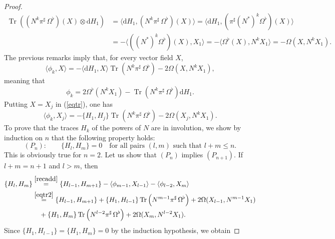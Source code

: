 \documentclass[10pt,a4paper]{amsart}
\def\Tr{\operatorname{Tr}}
\newcommand{\brke}[2]{{{\langle #1,#2\rangle}}}
\def\d{{\mathrm d}}
\def\parpo#1#2{\{#1,#2\}}
\begin{document}
\begin{proof}
\begin{equation}
\begin{split}
\Tr\left(({N}^k\pi^\sharp\,
\Omega^\flat)(X)\otimes \d H_1\right)
&=\brke{\d H_1}{({N}^k\pi^\sharp\,
\Omega^\flat)(X)}
=\brke{\d H_1}{(\pi^\sharp ({N}^*)^k \Omega^\flat)(X)}\\
&=-\brke{(({N}^*)^k \Omega^\flat)(X)}{X_1}
=-\brke{\Omega^\flat(X)}{{N}^k X_1}
=-\Omega(X,{N}^k X_1).
\end{split}
\end{equation}
The previous remarks imply that, for every vector field $X$,
\begin{equation}
\label{eqtr}
\brke{\phi_k}{X}=%
-\langle \d H_1,X\rangle\Tr\left({N}^k\pi^\sharp\,\Omega^\flat\right)-2\Omega(X,{N}^k X_1),
\end{equation}
meaning that
\begin{equation}
\label{eq-phi_k}
\phi_k=2\Omega^\flat({N}^k X_1)-\Tr\left({N}^k\pi^\sharp\,\Omega^\flat\right)\d H_1.
\end{equation}
Putting %
$X=X_j$ in (\ref{eqtr}), one has
\begin{equation}
\label{eqtr2}
\brke{\phi_k}{X_j}=-\parpo{H_1}{H_j}\Tr\left({N}^k\pi^\sharp\,\Omega^\flat\right)-2\Omega(X_j,{N}^k X_1).
\end{equation}
To prove that the traces $H_k$ of the powers of $N$ are in involution, we show by induction on $n$ 
that the following property holds:
\begin{equation*}
(P_n):\qquad\parpo{H_l}{H_m}=0\quad\mbox{for all pairs $(l,m)$ such that $l+m\le n$.}
\end{equation*}
This is obviously true for $n=2$. Let us show that $(P_n)$ implies $(P_{n+1})$. If $l+m=n+1$ and $l>m$, then 
\begin{equation}
\label{recadd2}
\begin{split}
\parpo{H_l}{H_m}&\stackrel{\eqref{recadd}}{=}\parpo{H_{l-1}}{H_{m+1}}-\brke{ \phi_{m-1}}{X_{l-1}}-\brke{\phi_{l-2}}{X_m}\\
&\stackrel{\eqref{eqtr2}}{=}\parpo{H_{l-1}}{H_{m+1}}+\parpo{H_1}{H_{l-1}}\Tr\left({N}^{m-1}\pi^\sharp\,\Omega^\flat\right)+2\Omega(X_{l-1},{N}^{m-1} X_1)\\
&\ \ \ +\parpo{H_1}{H_m}\Tr\left({N}^{l-2}\pi^\sharp\,\Omega^\flat\right)+2\Omega(X_m,{N}^{l-2} X_1).
\end{split}
\end{equation}
Since $\parpo{H_1}{H_{l-1}}=\parpo{H_1}{H_m}=0$ by the induction hypothesis, we obtain

\end{proof}
\end{document}

